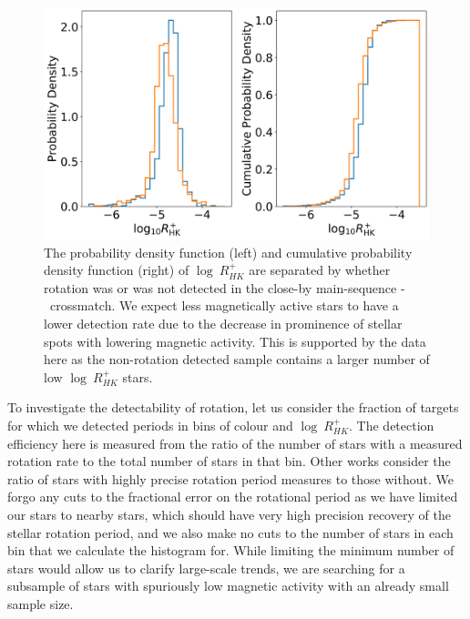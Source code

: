 \begin{figure}
\centering
  \includegraphics[width=\textwidth]{Figures/rot_gap_figures/pdf_cdf.png}
  \caption[The probability density function (left) and cumulative probability density function (right) of $\log \ R^{+}_{HK}$ are separated by whether rotation was (blue) or was not (orange) detected in the close-by main-sequence \kepler-\lamost\ crossmatch.]{
  	The probability density function (left) and cumulative probability density function (right) of $\log \ R^{+}_{HK}$ are separated by whether rotation was or was not detected in the close-by main-sequence \kepler-\lamost\ crossmatch. 
	We expect less magnetically active stars to have a lower detection rate due to the decrease in prominence of stellar spots with lowering magnetic activity.
 This is supported by the data here as the non-rotation detected sample contains a larger number of low $\log \ R^{+}_{HK}$ stars.}
  \label{fig:pdf_cdf}
\end{figure}

To investigate the detectability of rotation, let us consider the fraction of targets for which we detected periods in bins of colour and $\log \ R^{+}_{HK}$.
The detection efficiency here is measured from the ratio of the number of stars with a measured rotation rate to the total number of stars in that bin.
Other works \citep[see, e.g.,][]{claytor_tess_2023} consider the ratio of stars with highly precise rotation period measures to those without.
We forgo any cuts to the fractional error on the rotational period as we have limited our stars to nearby stars, which should have very high precision recovery of the stellar rotation period, and we also make no cuts to the number of stars in each bin that we calculate the histogram for. 
While limiting the minimum number of stars would allow us to clarify large-scale trends, we are searching for a subsample of stars with spuriously low magnetic activity with an already small sample size.

